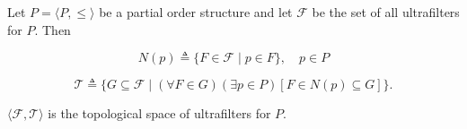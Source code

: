 Let $P = \langle P, \leq \rangle$ be a partial order structure and let $\mathcal{F}$ be the set of all ultrafilters for $P$. Then

$$N(p) \triangleq \{F \in \mathcal{F} \mid p \in F\}, \quad p \in P$$

$$\mathcal{T} \triangleq \{G \subseteq \mathcal{F} \mid (\forall F \in G)(\exists p \in P)[F \in N(p) \subseteq G]\}.$$

$\langle \mathcal{F}, \mathcal{T} \rangle$ is the topological space of ultrafilters for $P$.
